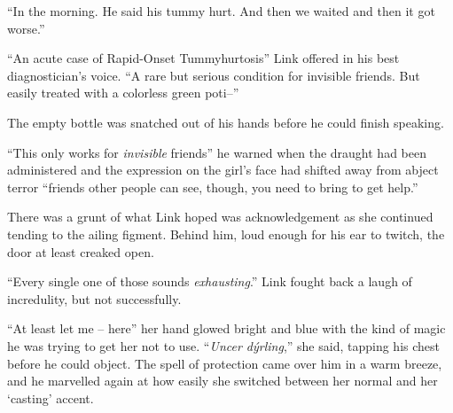 \documentclass[../FGP.tex]{subfiles}
\begin{document}
\begin{fragment}
``In the morning. He said his tummy hurt. And then we waited and then it got worse.''

``An acute case of Rapid-Onset Tummyhurtosis'' Link offered in his best diagnostician's voice. ``A rare but serious condition for invisible friends. But easily treated with a colorless green poti--''

The empty bottle was snatched out of his hands before he could finish speaking. 

``This only works for \emph{invisible} friends'' he warned when the draught had been administered and the expression on the girl's face had shifted away from abject terror ``friends other people can see, though, you need to bring to get help.''

There was a grunt of what Link hoped was acknowledgement as she continued tending to the ailing figment. Behind him, loud enough for his ear to twitch, the door at least creaked open. 
\end{fragment}

\begin{fragment}



``Every single one of those sounds \emph{exhausting}.'' Link fought back a laugh of incredulity, but not successfully. 

``At least let me -- here'' her hand glowed bright and blue with the kind of magic he was trying to get her not to use. ``\emph{Uncer dýrling},'' she said, tapping his chest before he could object. The spell of protection came over him in a warm breeze, and he marvelled again at how easily she switched between her normal and her `casting' accent. 
\end{fragment}
\end{document}
